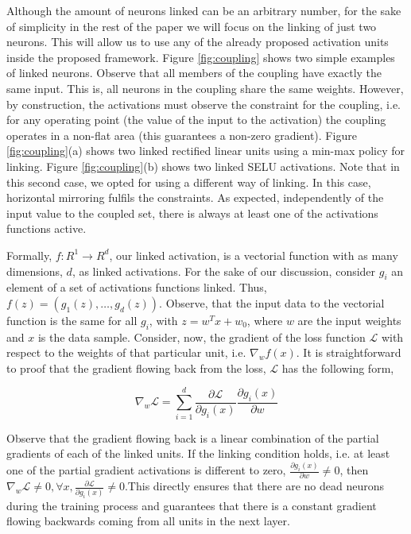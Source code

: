 \documentclass[10pt,twocolumn,letterpaper]{article}
\begin{document}
Although the amount of neurons linked can be an arbitrary number, for the sake of simplicity in the rest of the paper we will focus on the linking of just two neurons. This will allow us to use any of the already proposed activation units inside the proposed framework. Figure \ref{fig:coupling} shows two simple examples of linked neurons. Observe that all members of the coupling have exactly the same input. This is, all neurons in the coupling share the same weights. However, by construction, the activations must observe the constraint for the coupling, i.e. for any operating point (the value of the input to the activation) the coupling operates in a non-flat area (this guarantees a non-zero gradient). Figure \ref{fig:coupling}(a) shows two linked rectified linear units using a min-max policy for linking. Figure \ref{fig:coupling}(b) shows two linked SELU activations. Note that in this second case, we opted for using a different way of linking. In this case, horizontal mirroring fulfils the constraints. As expected, independently of the input value to the coupled set, there is always at least one of the activations functions active.  

Formally, $f\colon R^1\rightarrow R^{d}$, our linked activation, is a vectorial function with as many dimensions, $d$, as linked activations.  For the sake of our discussion, consider $g_i$ an element of a set of activations functions linked. Thus,  $f(z) = (g_1(z), \dots, g_d(z))$. Observe, that the input data to the vectorial function is the same for all $g_i$, with $z=w^Tx+w_0$, where $w$ are the input weights and $x$ is the data sample. Consider, now, the gradient of the loss function $\mathcal{L}$ with respect to the weights of that particular unit, i.e. $\nabla_w f(x)$. It is straightforward to proof that the gradient flowing back from the loss, $\mathcal{L}$ has the following form,

$$\nabla_w \mathcal{L}= \sum\limits_{i=1}^d  \frac{\partial \mathcal{L}}{\partial g_i(x)}\frac{\partial g_i(x)}{\partial w}$$

Observe that the gradient flowing back is a linear combination of the partial gradients of each of the linked units. If the linking condition holds, i.e. at least one of the partial gradient activations is different to zero, $\frac{\partial g_i(x)}{\partial w} \neq 0$, then $\nabla_w \mathcal{L}\neq0, \forall x, \frac{\partial \mathcal{L}}{\partial g_i(x)}\neq 0$.This directly ensures that there are no dead neurons during the training process and guarantees that there is a constant gradient flowing backwards coming from all units in the next layer.
\end{document}
